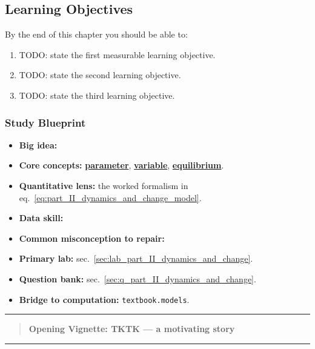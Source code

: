 \documentclass[
]{article}
\providecommand{\tightlist}{%
  \setlength{\itemsep}{0pt}\setlength{\parskip}{0pt}}
\theoremstyle{plain}
\theoremstyle{definition}
\begin{document}
\subsection{Learning Objectives}\label{learning-objectives-7}

By the end of this chapter you should be able to:

\begin{enumerate}
\def\labelenumi{\arabic{enumi}.}
\item
  TODO: state the first measurable learning objective.
\item
  TODO: state the second learning objective.
\item
  TODO: state the third learning objective.
\end{enumerate}

\subsubsection{Study Blueprint}\label{study-blueprint-7}

\begin{itemize}
\tightlist
\item
  \textbf{Big idea:}
\item
  \textbf{Core concepts:} \hyperref[gl:parameter]{\textbf{parameter}},
  \hyperref[gl:variable]{\textbf{variable}},
  \hyperref[gl:equilibrium]{\textbf{equilibrium}}.
\item
  \textbf{Quantitative lens:} the worked formalism in
  eq.~\ref{eq:part_II_dynamics_and_change_model}.
\item
  \textbf{Data skill:}
\item
  \textbf{Common misconception to repair:}
\item
  \textbf{Primary lab:} sec.~\ref{sec:lab_part_II_dynamics_and_change}.
\item
  \textbf{Question bank:} sec.~\ref{sec:q_part_II_dynamics_and_change}.
\item
  \textbf{Bridge to computation:} \texttt{textbook.models}.
\end{itemize}

\begin{center}\rule{0.5\linewidth}{0.5pt}\end{center}

\begin{quote}
\textbf{Opening Vignette: TKTK --- a motivating story}
\end{quote}

\begin{center}\rule{0.5\linewidth}{0.5pt}\end{center}
\end{document}
